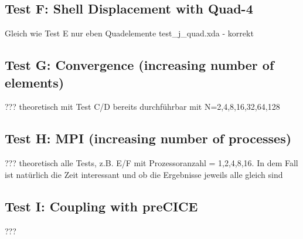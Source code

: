  \subsection{Test F: Shell Displacement with Quad-4}
 Gleich wie Test E nur eben Quadelemente\newline
 test\_j\_quad.xda - korrekt
 \subsection{Test G: Convergence (increasing number of elements)}
 ??? theoretisch mit Test C/D bereits durchführbar mit N=2,4,8,16,32,64,128
 \subsection{Test H: MPI (increasing number of processes)}
 ??? theoretisch alle Tests, z.B. E/F mit Prozessoranzahl = 1,2,4,8,16. In dem Fall ist natürlich die Zeit interessant und ob die Ergebnisse jeweils alle gleich sind
 \subsection{Test I: Coupling with preCICE}
 ???
\newpage